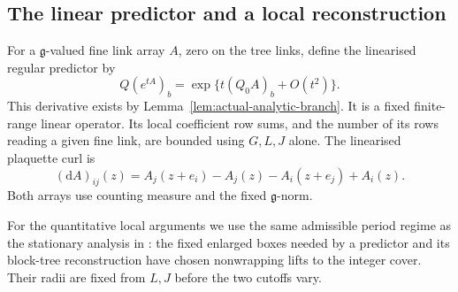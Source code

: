 \documentclass[11pt,reqno]{amsart}
\numberwithin{equation}{section}
\theoremstyle{definition}
\theoremstyle{remark}
\newcommand{\dd}{\mathrm d}
\newcommand{\g}{\mathfrak g}
\begin{document}
\subsection{The linear predictor and a local reconstruction}

For a \(\g\)-valued fine link array \(A\), zero on the tree links,
define the linearised regular predictor by
\begin{equation}
          Q(e^{tA})_b=\exp\{t(Q_0A)_b+O(t^2)\}.
 \label{eq:linear-predictor}
\end{equation}
This derivative exists by Lemma~\ref{lem:actual-analytic-branch}.
It is a fixed finite-range linear operator. Its local coefficient
row sums, and the number of its rows reading a given fine link,
are bounded using \(G,L,J\) alone. The linearised plaquette curl is
\begin{equation}
       (\dd A)_{ij}(z)
           =A_j(z+e_i)-A_j(z)-A_i(z+e_j)+A_i(z).
 \label{eq:linear-curl}
\end{equation}
Both arrays use counting measure and the fixed \(\g\)-norm.

For the quantitative local arguments we use the same admissible
period regime as the stationary analysis in \cite[Section~14]{Main}:
the fixed enlarged boxes needed by a predictor and its block-tree
reconstruction have chosen nonwrapping lifts to the integer cover.
Their radii are fixed from \(L,J\) before the two cutoffs vary.
\end{document}
